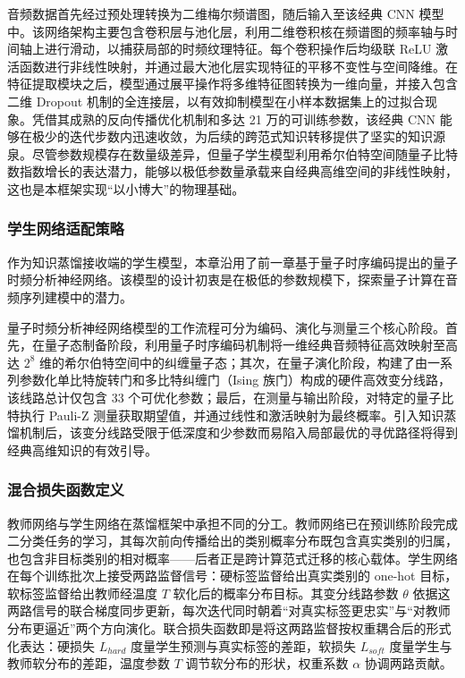音频数据首先经过预处理转换为二维梅尔频谱图，随后输入至该经典 CNN 模型中。该网络架构主要包含卷积层与池化层，利用二维卷积核在频谱图的频率轴与时间轴上进行滑动，以捕获局部的时频纹理特征。每个卷积操作后均级联 ReLU 激活函数进行非线性映射，并通过最大池化层实现特征的平移不变性与空间降维。在特征提取模块之后，模型通过展平操作将多维特征图转换为一维向量，并接入包含二维 Dropout 机制的全连接层，以有效抑制模型在小样本数据集上的过拟合现象。凭借其成熟的反向传播优化机制和多达 21 万的可训练参数，该经典 CNN 能够在极少的迭代步数内迅速收敛，为后续的跨范式知识转移提供了坚实的知识源泉。尽管参数规模存在数量级差异，但量子学生模型利用希尔伯特空间随量子比特数指数增长的表达潜力，能够以极低参数量承载来自经典高维空间的非线性映射，这也是本框架实现“以小博大”的物理基础。

\subsubsection{学生网络适配策略}
\label{subsec:student_model}

作为知识蒸馏接收端的学生模型，本章沿用了前一章基于量子时序编码提出的量子时频分析神经网络。该模型的设计初衷是在极低的参数规模下，探索量子计算在音频序列建模中的潜力。

量子时频分析神经网络模型的工作流程可分为编码、演化与测量三个核心阶段。首先，在量子态制备阶段，利用量子时序编码机制将一维经典音频特征高效映射至高达 $2^8$ 维的希尔伯特空间中的纠缠量子态；其次，在量子演化阶段，构建了由一系列参数化单比特旋转门和多比特纠缠门（Ising 族门）构成的硬件高效变分线路，该线路总计仅包含 33 个可优化参数；最后，在测量与输出阶段，对特定的量子比特执行 Pauli-Z 测量获取期望值，并通过线性和激活映射为最终概率。引入知识蒸馏机制后，该变分线路受限于低深度和少参数而易陷入局部最优的寻优路径将得到经典高维知识的有效引导。

\subsubsection{混合损失函数定义}
\label{subsec:loss_function}

教师网络与学生网络在蒸馏框架中承担不同的分工。教师网络已在预训练阶段完成二分类任务的学习，其每次前向传播给出的类别概率分布既包含真实类别的归属，也包含非目标类别的相对概率——后者正是跨计算范式迁移的核心载体。学生网络在每个训练批次上接受两路监督信号：硬标签监督给出真实类别的 one-hot 目标，软标签监督给出教师经温度 $T$ 软化后的概率分布目标。其变分线路参数 $\theta$ 依据这两路信号的联合梯度同步更新，每次迭代同时朝着“对真实标签更忠实”与“对教师分布更逼近”两个方向演化。联合损失函数即是将这两路监督按权重耦合后的形式化表达：硬损失 $L_{hard}$ 度量学生预测与真实标签的差距，软损失 $L_{soft}$ 度量学生与教师软分布的差距，温度参数 $T$ 调节软分布的形状，权重系数 $\alpha$ 协调两路贡献。

